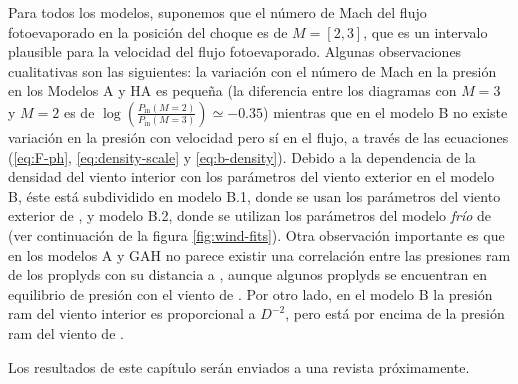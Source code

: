 Para todos los modelos, suponemos que el número de Mach del flujo fotoevaporado en la posición del choque es de $M=[2, 3]$, que es un intervalo plausible para la velocidad del flujo fotoevaporado. Algunas observaciones cualitativas son las siguientes: la variación con el número de Mach en la presión en los Modelos A y HA es pequeña (la diferencia entre los diagramas con $M=3$ y $M=2$ es de $\log\left(\frac{P_{\mathrm{in}}(M=2)}{P_{\mathrm{in}}(M=3)}\right)\simeq -0.35$) mientras que en el modelo B no existe variación en la presión con velocidad pero sí en el flujo, a través de las ecuaciones (\ref{eq:F-ph}, \ref{eq:density-scale} y \ref{eq:b-density}). Debido a la dependencia de la densidad del viento interior con los parámetros del viento exterior en el modelo B, éste está subdividido en modelo B.1, donde se usan los parámetros del viento exterior de \citet{GAH:2002}, y modelo B.2, donde se utilizan los parámetros del modelo \textit{frío} de \citet{Gagne:2005} (ver continuación de la figura \ref{fig:wind-fits}). Otra observación importante es que en los modelos A y GAH no parece existir una correlación entre las presiones ram de los proplyds con su distancia a \thC{}, aunque algunos proplyds se encuentran en equilibrio de presión con el viento de \thC{}. Por otro lado, en el modelo B la presión ram del viento interior es proporcional a $D^{-2}$, pero está por encima de la presión ram del viento de \thC{}. %

Los resultados de este capítulo serán enviados a una revista próximamente.

